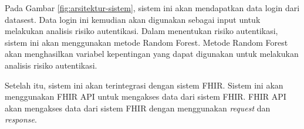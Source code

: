 Pada Gambar \ref{fig:arsitektur-sistem}, sistem ini akan mendapatkan data login dari datasest. Data login ini kemudian akan digunakan sebagai input untuk melakukan analisis risiko autentikasi. Dalam menentukan risiko autentikasi, sistem ini akan menggunakan metode Random Forest. Metode Random Forest akan menghasilkan variabel kepentingan yang dapat digunakan untuk melakukan analisis risiko autentikasi.

Setelah itu, sistem ini akan terintegrasi dengan sistem FHIR. Sistem ini akan menggunakan FHIR API untuk mengakses data dari sistem FHIR. FHIR API akan mengakses data dari sistem FHIR dengan menggunakan \textit{request} dan \textit{response}.